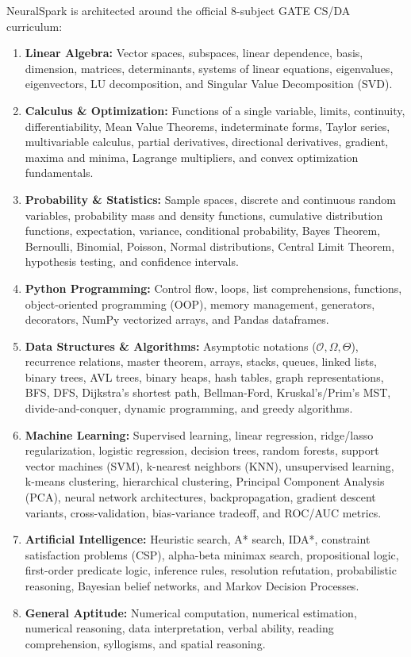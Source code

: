 NeuralSpark is architected around the official 8-subject GATE CS/DA curriculum:
\begin{enumerate}[leftmargin=*]
    \item \textbf{Linear Algebra:} Vector spaces, subspaces, linear dependence, basis, dimension, matrices, determinants, systems of linear equations, eigenvalues, eigenvectors, LU decomposition, and Singular Value Decomposition (SVD).
    \item \textbf{Calculus \& Optimization:} Functions of a single variable, limits, continuity, differentiability, Mean Value Theorems, indeterminate forms, Taylor series, multivariable calculus, partial derivatives, directional derivatives, gradient, maxima and minima, Lagrange multipliers, and convex optimization fundamentals.
    \item \textbf{Probability \& Statistics:} Sample spaces, discrete and continuous random variables, probability mass and density functions, cumulative distribution functions, expectation, variance, conditional probability, Bayes Theorem, Bernoulli, Binomial, Poisson, Normal distributions, Central Limit Theorem, hypothesis testing, and confidence intervals.
    \item \textbf{Python Programming:} Control flow, loops, list comprehensions, functions, object-oriented programming (OOP), memory management, generators, decorators, NumPy vectorized arrays, and Pandas dataframes.
    \item \textbf{Data Structures \& Algorithms:} Asymptotic notations ($\mathcal{O}, \Omega, \Theta$), recurrence relations, master theorem, arrays, stacks, queues, linked lists, binary trees, AVL trees, binary heaps, hash tables, graph representations, BFS, DFS, Dijkstra's shortest path, Bellman-Ford, Kruskal's/Prim's MST, divide-and-conquer, dynamic programming, and greedy algorithms.
    \item \textbf{Machine Learning:} Supervised learning, linear regression, ridge/lasso regularization, logistic regression, decision trees, random forests, support vector machines (SVM), k-nearest neighbors (KNN), unsupervised learning, k-means clustering, hierarchical clustering, Principal Component Analysis (PCA), neural network architectures, backpropagation, gradient descent variants, cross-validation, bias-variance tradeoff, and ROC/AUC metrics.
    \item \textbf{Artificial Intelligence:} Heuristic search, A* search, IDA*, constraint satisfaction problems (CSP), alpha-beta minimax search, propositional logic, first-order predicate logic, inference rules, resolution refutation, probabilistic reasoning, Bayesian belief networks, and Markov Decision Processes.
    \item \textbf{General Aptitude:} Numerical computation, numerical estimation, numerical reasoning, data interpretation, verbal ability, reading comprehension, syllogisms, and spatial reasoning.
\end{enumerate}

